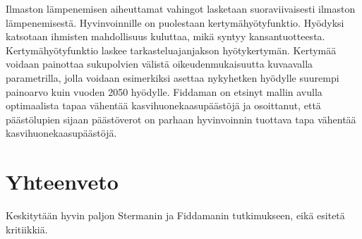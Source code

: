 \documentclass[finnish,12pt,a4paper,pdftex]{article}
\begin{document}
\begin{onehalfspacing}
Ilmaston lämpenemisen aiheuttamat vahingot lasketaan suoraviivaisesti ilmaston lämpenemisestä. Hyvinvoinnille on puolestaan kertymähyötyfunktio. Hyödyksi katsotaan ihmisten mahdollisuus kuluttaa, mikä syntyy kansantuotteesta. Kertymähyötyfunktio laskee tarkasteluajanjakson hyötykertymän. Kertymää voidaan painottaa sukupolvien välistä oikeudenmukaisuutta kuvaavalla parametrilla, jolla voidaan esimerkiksi asettaa nykyhetken hyödylle suurempi painoarvo kuin vuoden 2050 hyödylle. \cite{Fiddaman1997, Fiddaman2002} Fiddaman \cite{Fiddaman2002} on etsinyt mallin avulla optimaalista tapaa vähentää kasvihuonekaasupäästöjä ja osoittanut, että päästölupien sijaan päästöverot on parhaan hyvinvoinnin tuottava tapa vähentää kasvihuonekaasupäästöjä. 

\clearpage




\section{Yhteenveto \label{yhteenveto}}

Keskitytään hyvin paljon Stermanin ja Fiddamanin tutkimukseen, eikä esitetä kritiikkiä. 

\clearpage
{}
{}
%
%
\printbibliography

\end{onehalfspacing} %
\end{document}
